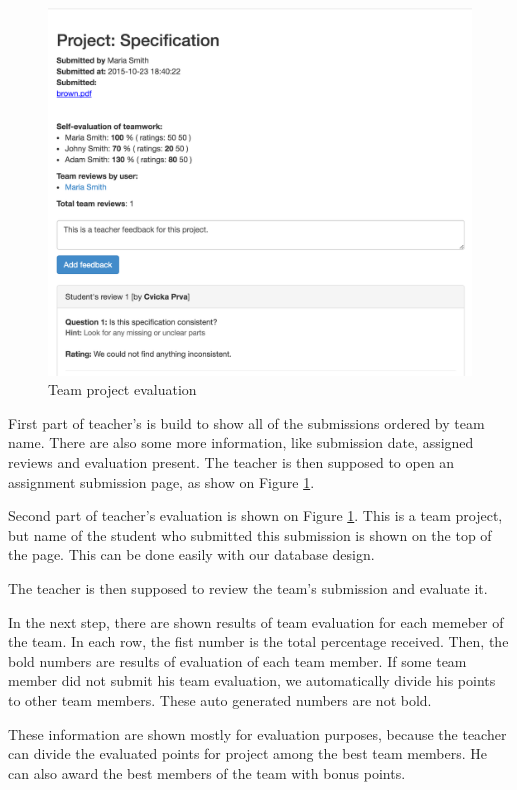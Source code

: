 \begin{figure}[h]
    \centering
    \includegraphics[width=\textwidth]{images/teamprojectevaluation.png}
    \caption{Team project evaluation}
    \label{team_submission_admin}
\end{figure}

First part of teacher's is build to show all of the submissions ordered by team name. There are also some more information, like submission date, assigned reviews and evaluation present. The teacher is then supposed to open an assignment submission page, as show on Figure \ref{team_submission_admin}.

Second part of teacher's evaluation is shown on Figure \ref{team_submission_admin}. This is a team project, but name of the student who submitted this submission is shown on the top of the page. This can be done easily with our database design. 

The teacher is then supposed to review the team's submission and evaluate it. 

In the next step, there are shown results of team evaluation for each memeber of the team. In each row, the fist number is the total percentage received. Then, the bold numbers are results of evaluation of each team member. If some team member did not submit his team evaluation, we automatically divide his points to other team members. These auto generated numbers are not bold.

These information are shown mostly for evaluation purposes, because the teacher can divide the evaluated points for project among the best team members. He can also award the best members of the team with bonus points.

